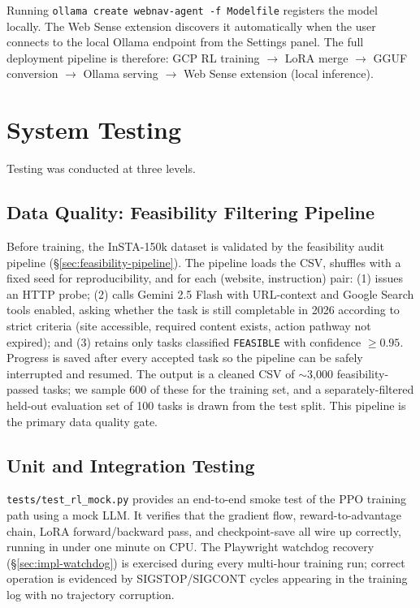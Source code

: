 \documentclass[12pt,a4paper]{report}
\begin{document}
\noindent Running \texttt{ollama create webnav-agent -f Modelfile} registers the model locally. The Web Sense extension discovers it automatically when the user connects to the local Ollama endpoint from the Settings panel. The full deployment pipeline is therefore: GCP RL training $\to$ LoRA merge $\to$ GGUF conversion $\to$ Ollama serving $\to$ Web Sense extension (local inference).

\section{System Testing}\label{sec:testing}

Testing was conducted at three levels.

\subsection*{Data Quality: Feasibility Filtering Pipeline}

Before training, the InSTA-150k dataset is validated by the feasibility audit pipeline (\S\ref{sec:feasibility-pipeline}). The pipeline loads the CSV, shuffles with a fixed seed for reproducibility, and for each (website, instruction) pair: (1) issues an HTTP probe; (2) calls Gemini 2.5 Flash with URL-context and Google Search tools enabled, asking whether the task is still completable in 2026 according to strict criteria (site accessible, required content exists, action pathway not expired); and (3) retains only tasks classified \texttt{FEASIBLE} with confidence $\geq 0.95$. Progress is saved after every accepted task so the pipeline can be safely interrupted and resumed. The output is a cleaned CSV of $\sim$3{,}000 feasibility-passed tasks; we sample 600 of these for the training set, and a separately-filtered held-out evaluation set of 100 tasks is drawn from the test split. This pipeline is the primary data quality gate.

\subsection*{Unit and Integration Testing}

\texttt{tests/test\_rl\_mock.py} provides an end-to-end smoke test of the PPO training path using a mock LLM. It verifies that the gradient flow, reward-to-advantage chain, LoRA forward/backward pass, and checkpoint-save all wire up correctly, running in under one minute on CPU. The Playwright watchdog recovery (\S\ref{sec:impl-watchdog}) is exercised during every multi-hour training run; correct operation is evidenced by SIGSTOP/SIGCONT cycles appearing in the training log with no trajectory corruption.
\end{document}
